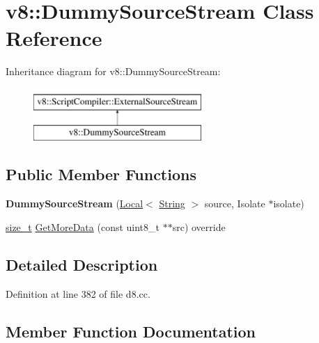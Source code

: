 \hypertarget{classv8_1_1DummySourceStream}{}\section{v8\+:\+:Dummy\+Source\+Stream Class Reference}
\label{classv8_1_1DummySourceStream}
Inheritance diagram for v8\+:\+:Dummy\+Source\+Stream\+:\begin{figure}[H]
\begin{center}
\leavevmode
\includegraphics[height=2.000000cm]{classv8_1_1DummySourceStream}
\end{center}
\end{figure}
\subsection*{Public Member Functions}
\begin{DoxyCompactItemize}
\item 
\mbox{\label{classv8_1_1DummySourceStream_a87cba21b72735c1322df59c68c0472ad}} 
{\bfseries Dummy\+Source\+Stream} (\mbox{\hyperlink{classv8_1_1Local}{Local}}$<$ \mbox{\hyperlink{classv8_1_1String}{String}} $>$ source, Isolate $\ast$isolate)
\item 
\mbox{\hyperlink{classsize__t}{size\+\_\+t}} \mbox{\hyperlink{classv8_1_1DummySourceStream_a0b4b9e3f0d0747d169ba75e68fe596d7}{Get\+More\+Data}} (const uint8\+\_\+t $\ast$$\ast$src) override
\end{DoxyCompactItemize}


\subsection{Detailed Description}


Definition at line 382 of file d8.\+cc.



\subsection{Member Function Documentation}
\mbox{\label{classv8_1_1DummySourceStream_a0b4b9e3f0d0747d169ba75e68fe596d7}} 
